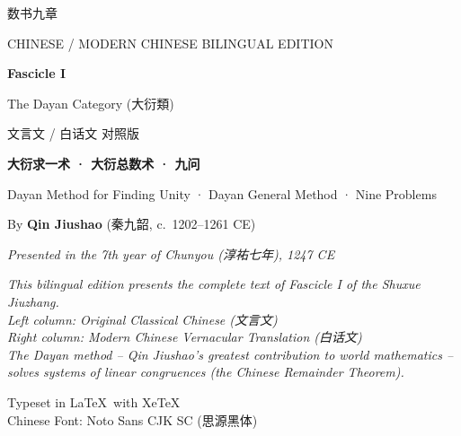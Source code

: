 \documentclass[11pt,a4paper]{article}
\newcommand{\zhtext}[1]{{\chinese #1}}
\begin{document}
\begin{titlepage}
\centering
\vspace*{2cm}

{\fontsize{34}{40}\selectfont\chineselg
\textcolor{titlecolor}{数书九章}}

\vspace{0.8cm}

{\fontsize{16}{20}\selectfont
\textcolor{sectioncolor}{CHINESE / MODERN CHINESE BILINGUAL EDITION}}

\vspace{1.2cm}

{\LARGE\bfseries\color{sectioncolor} Fascicle I}

\vspace{0.5cm}

{\Large The Dayan Category (\zhtext{大衍類})}

\vspace{0.5cm}

{\large\zhtext{文言文 / 白话文 对照版}}

\vspace{0.8cm}

\begin{tcolorbox}[colback=leftbg,colframe=leftframe,arc=3pt,boxrule=1pt,
  width=0.85\textwidth,center]
\centering
{\large\bfseries\color{leftheader}\chinese 大衍求一术 · 大衍总数术 · 九问}\par
\vspace{4pt}
{\normalsize Dayan Method for Finding Unity · Dayan General Method · Nine Problems}
\end{tcolorbox}

\vspace{1.5cm}

{\large By \textbf{Qin Jiushao} (\zhtext{秦九韶}, c.~1202--1261 CE)\par[0.5em]
\textit{Presented in the 7th year of Chunyou (\zhtext{淳祐七年}), 1247 CE}}

\vspace{1.5cm}

\begin{minipage}{0.8\textwidth}
\centering
\small
\textcolor{prefacecolor}{\textit{This bilingual edition presents the complete text of Fascicle I of the Shuxue Jiuzhang.\\
Left column: Original Classical Chinese (\zhtext{文言文})\\
Right column: Modern Chinese Vernacular Translation (\zhtext{白话文})\\
The Dayan method -- Qin Jiushao's greatest contribution to world mathematics --\\
solves systems of linear congruences (the Chinese Remainder Theorem).}}
\end{minipage}

\vfill

{\small Typeset in \LaTeX\ with XeTeX\\
Chinese Font: Noto Sans CJK SC (\zhtext{思源黑体})}

\end{titlepage}
\end{document}
